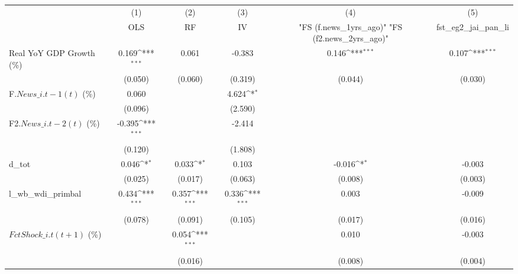 {
\def\sym#1{\ifmmode^{#1}\else\(^{#1}\)\fi}
\begin{tabular}{l*{5}{c}}
\toprule
                    &\multicolumn{1}{c}{(1)}&\multicolumn{1}{c}{(2)}&\multicolumn{1}{c}{(3)}&\multicolumn{1}{c}{(4)}&\multicolumn{1}{c}{(5)}\\
                    &\multicolumn{1}{c}{OLS}&\multicolumn{1}{c}{RF}&\multicolumn{1}{c}{IV}&\multicolumn{1}{c}{ "FS (f.news\_1yrs\_ago)"  "FS (f2.news\_2yrs\_ago)" }&\multicolumn{1}{c}{fst\_eg2\_jai\_pan\_li}\\
\midrule
Real YoY GDP Growth (\%)&       0.169\sym{***}&       0.061         &      -0.383         &       0.146\sym{***}&       0.107\sym{***}\\
                    &     (0.050)         &     (0.060)         &     (0.319)         &     (0.044)         &     (0.030)         \\
\addlinespace
F.$ News\_{i.t-1}(t)$ (\%)&       0.060         &                     &       4.624\sym{*}  &                     &                     \\
                    &     (0.096)         &                     &     (2.590)         &                     &                     \\
\addlinespace
F2.$ News\_{i.t-2}(t)$ (\%)&      -0.395\sym{***}&                     &      -2.414         &                     &                     \\
                    &     (0.120)         &                     &     (1.808)         &                     &                     \\
\addlinespace
d\_tot               &       0.046\sym{*}  &       0.033\sym{*}  &       0.103         &      -0.016\sym{*}  &      -0.003         \\
                    &     (0.025)         &     (0.017)         &     (0.063)         &     (0.008)         &     (0.003)         \\
\addlinespace
l\_wb\_wdi\_primbal    &       0.434\sym{***}&       0.357\sym{***}&       0.336\sym{***}&       0.003         &      -0.009         \\
                    &     (0.078)         &     (0.091)         &     (0.105)         &     (0.017)         &     (0.016)         \\
\addlinespace
$ FctShock\_{i.t}(t+1)$ (\%)&                     &       0.054\sym{***}&                     &       0.010         &      -0.003         \\
                    &                     &     (0.016)         &                     &     (0.008)         &     (0.004)         \\

\end{tabular}}
